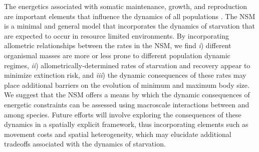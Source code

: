 \documentclass{pnastwo}
\begin{document}
\begin{article}
The energetics associated with somatic maintenance, growth, and reproduction are important elements that influence the dynamics of all populations \cite{Stearns:1989ip}.
The NSM is a minimal and general model that incorporates the dynamics of starvation that are expected to occur in resource limited environments.
By incorporating allometric relationships between the rates in the NSM, we find
\emph{i}) different organismal masses are more or less prone to different population dynamic regimes,
\emph{ii}) allometrically-determined rates of starvation and recovery appear to minimize extinction risk, and
\emph{iii}) the dynamic consequences of these rates may place additional barriers on the evolution of minimum and maximum body size.
We suggest that the NSM offers a means by which the dynamic consequences of energetic constraints can be assessed using macroscale interactions between and among species.
Future efforts will involve exploring the consequences of these dynamics in a spatially explicit framework, thus incorporating elements such as movement costs and spatial heterogeneity, which may elucidate additional tradeoffs associated with the dynamics of starvation.

%
%
%
%
%
%
%
%
%
%
%
%
%




\end{article}
\end{document}
